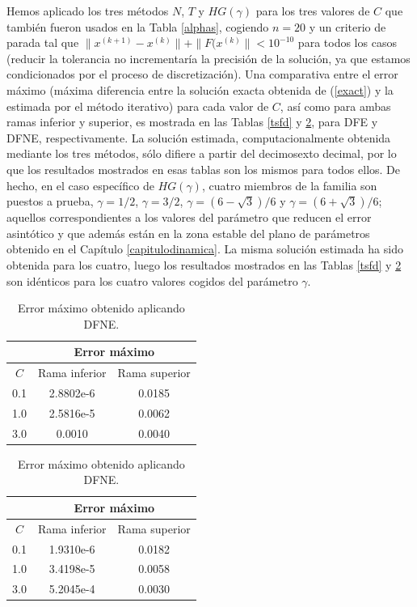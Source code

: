 Hemos aplicado los tres métodos $N$, $T$ y  $HG(\gamma)$ para los tres valores de $C$ que también fueron usados en la Tabla \ref{alphas}, cogiendo $n=20$ y un criterio de parada tal que $\|x^{(k+1)}-x^{(k)} \|+\|F(x^{(k)} \|< 10^{-10}$ para todos los casos (reducir la tolerancia no incrementaría la precisión de la solución, ya que estamos condicionados por el proceso de discretización). Una comparativa entre el error máximo (máxima diferencia entre la solución exacta obtenida de (\ref{exact}) y la estimada por el método iterativo) para cada valor de $C$, así como para ambas ramas inferior y superior, es mostrada en las Tablas \ref{tsfd} y \ref{tnsfd}, para DFE y DFNE, respectivamente. La solución estimada, computacionalmente obtenida mediante los tres métodos, sólo difiere a partir del decimosexto decimal, por lo que los resultados mostrados en esas tablas son los mismos para todos ellos. De hecho, en el caso específico de $HG(\gamma)$, cuatro miembros de la familia son puestos a prueba, $\gamma=1/2$, $\gamma=3/2$, $\gamma=(6-\sqrt{3})/6$ y $\gamma=(6+\sqrt{3})/6$; aquellos correspondientes a los valores del parámetro que reducen el error asintótico y que además están en la zona estable del plano de parámetros obtenido en el Capítulo \ref{capitulodinamica}. La misma solución estimada ha sido obtenida para los cuatro, luego los resultados mostrados en las Tablas \ref{tsfd} y \ref{tnsfd} son idénticos para los cuatro valores cogidos del parámetro $\gamma$.

\begin{table}[h!]
	\parbox{.45\linewidth}{
		\centering
		\begin{tabular}{c|c|c|}
			\cline{2-3}
			\multicolumn{1}{l|}{}       & \multicolumn{2}{c|}{Error máximo} \\ \hline
			\multicolumn{1}{|c|}{$C$}   & Rama inferior     & Rama superior     \\ \hline
			\multicolumn{1}{|c|}{0.1}   & 2.8802e-6        & 0.0185   \\ \hline
			\multicolumn{1}{|c|}{1.0}   & 2.5816e-5        & 0.0062    \\ \hline
			\multicolumn{1}{|c|}{3.0}   & 0.0010           & 0.0040    \\ \hline
		\end{tabular}
		\caption{Error máximo obtenido aplicando DFE.}\label{tsfd}
	}
	\hfill
	\parbox{.45\linewidth}{
		\centering
		\begin{tabular}{c|c|c|}
			\cline{2-3}
			\multicolumn{1}{l|}{}       & \multicolumn{2}{c|}{Error máximo} \\ \hline
			\multicolumn{1}{|c|}{$C$}   & Rama inferior     & Rama superior     \\ \hline
			\multicolumn{1}{|c|}{0.1}   & 1.9310e-6        & 0.0182   \\ \hline
			\multicolumn{1}{|c|}{1.0}   & 3.4198e-5        & 0.0058  \\ \hline
			\multicolumn{1}{|c|}{3.0}   & 5.2045e-4        & 0.0030   \\ \hline
		\end{tabular}
		\caption{Error máximo obtenido aplicando DFNE.}\label{tnsfd}
	}
\end{table}

